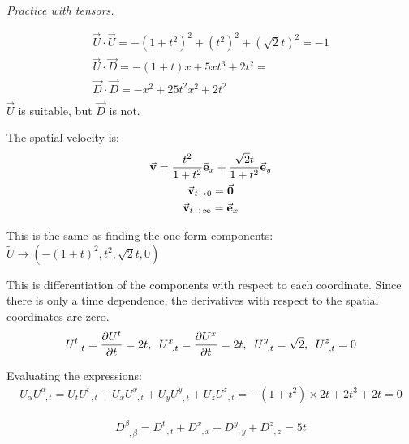 \documentclass{report}
\begin{document}
\begin{subquests}
	\item \emph{Practice with tensors.}
	\begin{subquests}
		\item
		\begin{gather*}
			\vec U \cdot \vec U = -(1+t^2)^2 + (t^2)^2 + (\sqrt{2} t)^2 = -1 \\
			\vec U \cdot \vec D = -(1+t)x + 5xt^3 + 2t^2 =  \\
			\vec D \cdot \vec D = -x^2 + 25t^2 x^2 + 2t^2 \\
		\end{gather*}
		$\vec U$ is suitable, but $\vec D$ is not. 

		\item		
		The spatial velocity is:
		\begin{gather*}
		 	{\va v} = \frac{t^2}{1+t^2}{\va e}_x + \frac{\sqrt{2}t}{1+t^2}{\va e}_y \\
		 	{\va v}_{t\to 0} = {\va 0} \\
		 	{\va v}_{t \to \infty} = {\va e}_x
		\end{gather*} 

		\item		
		This is the same as finding the one-form components: ${\tilde U} \longrightarrow (-(1+t)^2, t^2, \sqrt{2}t, 0)$ 

		\item		
		This is differentiation of the components with respect to each coordinate. Since there is only a time dependence, the derivatives with respect to the spatial coordinates are zero.
		\begin{gather*}
			U^t_{\;\;,t} = \pdv{U^t}{t} = 2t, \;\; U^x_{\;\;,t} = \pdv{U^x}{t} = 2t, \;\; U^y_{\;\;,t} = \sqrt{2}, \;\; U^z_{\;\;,t} = 0
		\end{gather*}

		\item		
		Evaluating the expressions:
		\begin{gather*}
			U_{\alpha}U^{\alpha}_{\;\;,t} = U_{t}U^{t}_{\;\;,t} + U_{x}U^{x}_{\;\;,t} + U_{y}U^{y}_{\;\;,t} + U_{z}U^{z}_{\;\;,t} = -(1+t^2)\times 2t + 2t^3 + 2t = 0 
		\end{gather*}

		\item		
		\begin{gather*}
			D^{\beta}_{\;\;,\beta} = D^{t}_{\;\;,t} + D^{x}_{\;\;,x} + D^{y}_{\;\;,y} + D^{z}_{\;\;,z} = 5t 
		\end{gather*}
		\item


\end{subquests}
\end{subquests}
\end{document}

